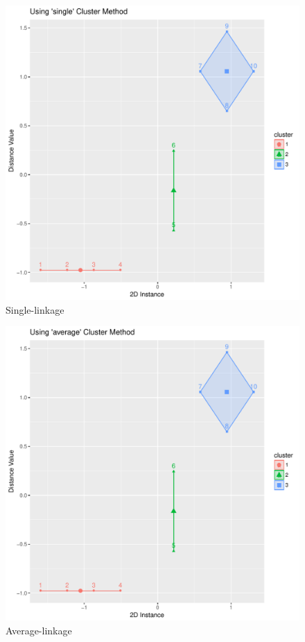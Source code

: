 \documentclass[letterpaper,11pt]{article}
\begin{document}
\begin{figure}[h]
\centering
\includegraphics[scale=0.5]{single.pdf}
\caption{Single-linkage}
\label{fig:1}
\end{figure}

\begin{figure}[h]
\centering
\includegraphics[scale=0.45]{average.pdf}
\caption{Average-linkage}
\label{fig:2}
\end{figure}
\end{document}
